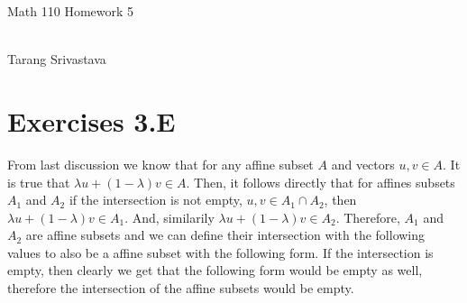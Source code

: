 \documentclass[10pt, twocolumn]{article}
\author{Tarang Srivastava}
\newcommand{\makechaptertitle}[1]{
\begin{center}
	\begin{large}
		#1
	\end{large}
	\begin{small}
		\\Tarang Srivastava
	\end{small}
\end{center}
}
\begin{document}
	
\makechaptertitle{Math 110 Homework 5}

\section{Exercises 3.E}
\begin{q}[3]
    
\end{q}
\begin{q}[10]
    From last discussion we know that for any affine subset $ A $ and vectors $ u, v \in A $. 
    It is true that $ \lambda u + (1 - \lambda) v \in A $. 
    Then, it follows directly that for affines subsets $ A_1 $ and $ A_2 $ if the intersection is not empty, 
    $ u, v \in A_1 \cap A_2 $, then $ \lambda u + (1 - \lambda) v \in A_1 $. 
    And, similarily $ \lambda u + (1 - \lambda) v \in A_2 $.  
    Therefore, $ A_1 $ and $ A_2 $ are affine subsets and we can define their intersection with the following values to also be a affine subset with the following form. 
    If the intersection is empty, then clearly we get that the following form would be empty as well, therefore the intersection of the affine subsets would be empty.
\end{q}
\begin{q}[11]

    
\end{q}
\end{document}
